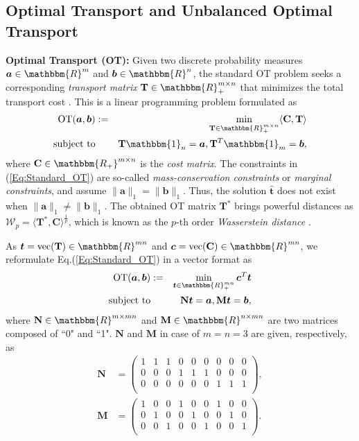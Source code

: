\documentclass[twoside]{article}
\theoremstyle{plain}
\newcommand{\R}{\mathbbm{R}}
\newcommand{\one}{\mathbbm{1}}
\newcommand{\mat}[1]{\mathbf{#1}}
\renewcommand{\vec}[1]{\bm{#1}}
\begin{document}
\subsection{Optimal Transport and Unbalanced Optimal Transport}
{\bf Optimal Transport (OT):} Given two discrete probability measures $\vec{a}\in \R^{m}$ and $\vec{b} \in \R^{n}$, the standard OT problem seeks a corresponding {\it transport matrix} $\mat{T} \in \R_{+}^{m \times n}$ that minimizes the total transport cost \citep{Kantorovich_1942}. This is a linear programming problem formulated as
\begin{eqnarray}
\label{Eq:Standard_OT}
\operatorname{OT}(\vec{a},\vec{b}) &:=& \min_{ \mat{T} \in \R_{+}^{m \times n}} \langle \mat{C}, \mat{T} \rangle \\
\text{subject\ to}&& \mat{T} \one_n= \vec{a}, \mat{T}^{T}\one_m = \vec{b}, \notag
\end{eqnarray}
where $\mat{C} \in \mathbbm{R_{+}}^{m \times n}$ is the {\it cost matrix}. The constraints in (\ref{Eq:Standard_OT}) are so-called {\it mass-conservation constraints} or {\it marginal constraints}, and assume $\|\vec{a}\|_1 = \|\vec{b}\|_1$. Thus, the solution $\hat{\vec{t}}$ does not exist when $\|\vec{a}\|_1 \neq \|\vec{b}\|_1$. The obtained OT matrix $\mat{T}^*$ brings powerful distances as $\mathcal{W}_p = \langle \mat{T}^*,\mat{C} \rangle^{\frac{1}{p}}$, which is known as the $p$-th order {\it Wasserstein distance} \citep{Villani_2008_OTBook}. 


As $\vec{t} = \text{vec}({\mat{T}}) \in \mathbbm{R}^{mn}$ and $\vec{c} = \text{vec}({\mat{C}}) \in \mathbbm{R}^{mn}$, we reformulate Eq.(\ref{Eq:Standard_OT}) in a vector format as \citep{Chapel_NeurIPS_2021}
\begin{eqnarray}
\label{Eq:Vector_OT}
\operatorname{OT}(\vec{a},\vec{b}) &:=& \min_{\vec{t} \in \R_{+}^{mn}} \vec{c}^T\vec{t} \\
\text{subject\ to}&& \mat{N}\vec{t} = \vec{a}, \mat{M}\vec{t} = \vec{b}, \notag
\end{eqnarray}
where $\mat{N} \in \R^{m \times mn}$ and $\mat{M} \in \R^{n \times mn}$ are two matrices composed of ``0" and ``1". $\mat{N}$ and $\mat{M}$ in case of $m=n=3$ are given, respectively, as
\begin{equation*}
\begin{split}
\mat{N}&=\begin{pmatrix}
1&1&1& 0& 0& 0& 0& 0&0\\
0 & 0& 0&1&1&1& 0& 0&0\\
0 & 0& 0& 0& 0& 0&1&1&1\\
\end{pmatrix},\\
\mat{M}&=\begin{pmatrix}
 1& 0& 0&1& 0& 0&1& 0&0\\
 0&1& 0& 0&1& 0& 0&1&0\\
 0& 0&1& 0& 0&1& 0& 0&1\\
 \end{pmatrix}.
  \end{split}
 \end{equation*}
\end{document}
